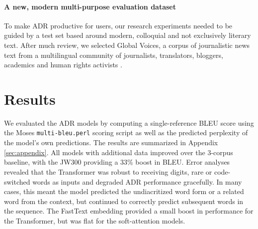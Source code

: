 \documentclass{article} %
\begin{document}
\paragraph{A new, modern multi-purpose evaluation dataset}\label{sec:evaldataset} To make ADR productive for users, our research experiments needed to be guided by a test set based around modern, colloquial and not exclusively literary text. After much review, we selected Global Voices, a corpus of journalistic news text %
from a multilingual community of journalists, translators, bloggers, academics and human rights activists \citep{global_voices}.



\section{Results}\label{sec:results}
We evaluated the ADR models by computing a single-reference BLEU score using the Moses \texttt{multi-bleu.perl} scoring script as well as the predicted perplexity of the model's own predictions. The results are summarized in Appendix \ref{sec:appendix}. All models with additional data improved over the 3-corpus baseline, with the JW300 providing a 33\% boost in BLEU. Error analyses revealed that the Transformer was robust to receiving digits, rare or code-switched words as inputs and degraded ADR performance gracefully. In many cases, this meant the model predicted the undiacritized word form or a related word from the context, but continued to correctly predict subsequent words in the sequence. The FastText embedding provided a small boost in performance for the Transformer, but was flat for the soft-attention models. 
  
\end{document}

